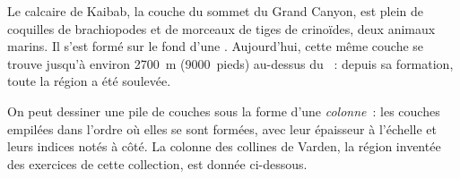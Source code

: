 \begin{example}\label{ex:g7:sediments-and-fossils:kaibab}
Le calcaire de Kaibab, la couche du sommet du Grand Canyon, est plein de
coquilles de brachiopodes et de morceaux de tiges de crinoïdes, deux
animaux marins. Il s'est formé sur le fond d'une . Aujourd'hui, cette
même couche se trouve jusqu'à environ \qty{2700}{m} (\num{9000}~pieds)
au-dessus du ~: depuis sa formation, toute la région a été
soulevée.
\end{example}

On peut dessiner une pile de couches sous la forme d'une \emph{colonne}~:
les couches empilées dans l'ordre où elles se sont formées, avec leur
épaisseur à l'échelle et leurs indices notés à côté. La colonne des
collines de Varden, la région inventée des exercices de cette collection,
est donnée ci-dessous.

